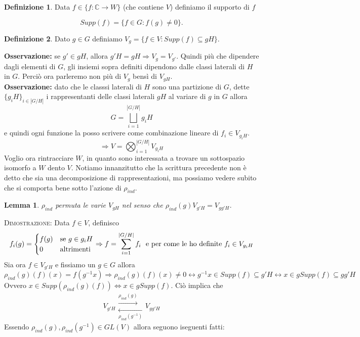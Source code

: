 \documentclass[11pt]{article}
\theoremstyle{plain}
\newtheorem{lemma}[thm]{Lemma}
\theoremstyle{definition}
\newtheorem{defn}{Definizione}[section]
\theoremstyle{remark}
\newcommand{\C}{\mathbb{C}}
\begin{document}
\begin{defn}
Data $f\in \{f:\C\rightarrow W\}$ (che contiene $V$) definiamo il supporto di $f$ 

\[Supp(f)=\{f\in G:f(g)\neq 0\}.\]
\end{defn}

\begin{defn}
Dato $g\in G$ definiamo $V_g=\{f\in V : Supp(f)\subseteq gH \}$.
\end{defn}

\textbf{Osservazione:} se $g'\in gH$, allora $g'H=gH\Rightarrow V_g=V_{g'}$. Quindi più che dipendere dagli elementi di $G$, gli insiemi sopra definiti dipendono dalle classi laterali di $H$ in $G$. Perciò ora parleremo non più di $V_g$ bensì di $V_{gH}$.\\
\textbf{Osservazione:} dato che le classsi laterali di $H$ sono una partizione di $G$, dette $\{g_iH\}_{i\in |G/H|}$ i rappresentanti delle classi laterali $gH$ al variare di $g$ in $G$ allora 
\[G=\bigsqcup_{i=1}^{|G/H|} g_iH\] 
e quindi ogni funzione la posso scrivere come combinazione lineare di $f_i\in V_{g_iH}$.
\[\Rightarrow V=\bigotimes_{i=1}^{|G/H|} V_{g_iH}\]
Voglio ora rintracciare $W$, in quanto sono interessata a trovare un sottospazio isomorfo a $W$ dento $V$. Notiamo innanzitutto che la scrittura precedente non è detto che sia una decomposizione di rappresentazioni, ma possiamo vedere subito che si comporta bene sotto l'azione di $\rho_{ind}$. 
\begin{lemma}
$\rho_{ind}$ permuta le varie $V_{gH}$ nel senso che $\rho_{ind}(g)V_{g'H}=V_{gg'H}$. 
\end{lemma}
\textsc{Dimostrazione:} Data $f\in V$, definisco
\[f_i(g)=\begin{cases}
f(g)& \textup{se } g\in g_iH\\
0& \textup{altrimenti}
\end{cases}\Rightarrow f=\sum_{i=1}^{|G/H|} f_i\ \textup{ e per come le ho definite } f_i\in V_{g_iH}\]
Sia ora $f\in V_{g'H}$ e fissiamo un $g\in G$ allora
\[\rho_{ind}(g)(f)(x)=f(g^{-1}x)\Rightarrow \rho_{ind}(g)(f)(x)\neq 0\leftrightarrow g^{-1}x\in Supp(f)\subseteq g'H\leftrightarrow x\in gSupp(f)\subseteq gg'H\]
Ovvero $x\in Supp(\rho_{ind}(g)(f))\Leftrightarrow x\in gSupp(f)$. Ciò implica che
\[ V_{g'H} \begin{matrix}
\overset{\rho_{ind}(g)}{\longrightarrow}\\ 
\underset{\rho_{ind}(g^{-1})}{\longleftarrow}
\end{matrix} V_{gg'H} \]
Essendo $\rho_{ind}(g),\rho_{ind}(g^{-1})\in GL(V)$ allora seguono iseguenti fatti:
\end{document}
